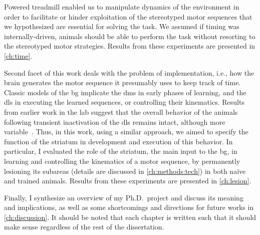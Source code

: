 Powered treadmill enabled us to manipulate dynamics of the environment in order to facilitate or hinder exploitation of the stereotyped motor sequences that we hypothesized are essential for solving the task.
We assumed if timing was internally-driven, animals should be able to perform the task without resorting to the stereotyped motor strategies.
Results from these experiments are presented in \autoref{ch:time}.
\par
Second facet of this work deals with the problem of implementation, i.e., how the brain generates the motor 
sequence it presumably uses to keep track of time.
Classic models of the \gls{bg} implicate the \gls{dms} in early phases of learning, and the \gls{dls} in executing the learned sequences, or controlling their kinematics.
Results from earlier work in the lab suggest that the overall behavior of the animals following transient inactivation of the \gls{dls} remains intact, although more variable~\cite{Rueda2015NN}.
Thus, in this work, using a similar approach, we aimed to specify the function of the striatum in development and execution of this behavior.
In particular, I evaluated the role of the striatum, the main input to the \gls{bg}, in learning and controlling the kinematics of a motor sequence, by permanently lesioning its subareas (details are discussed in \autoref{ch:methods:tech}) in both na\"ive and trained animals.
Results from these experiments are presented in \autoref{ch:lesion}.
\par
Finally, I synthesize an overview of my Ph.D.\ project and discuss its meaning and implications, as well as some shortcomings and directions for future works in \autoref{ch:discussion}.
It should be noted that each chapter is written such that it should make sense regardless of the rest of the dissertation.
